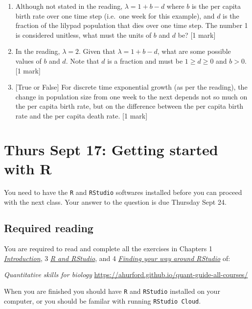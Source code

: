 \documentclass[]{book}
\begin{document}
\begin{enumerate}
\def\labelenumi{\arabic{enumi}.}
\setcounter{enumi}{6}
\item
  Although not stated in the reading, \(\lambda = 1 + b - d\) where
  \(b\) is the per capita birth rate over one time step (i.e.~one week
  for this example), and \(d\) is the fraction of the lilypad population
  that dies over one time step. The number 1 is considered unitless,
  what must the units of \(b\) and \(d\) be? {[}1 mark{]}
\item
  In the reading, \(\lambda = 2\). Given that \(\lambda = 1 + b - d\),
  what are some possible values of \(b\) and \(d\). {Note that \(d\) is
  a fraction and must be \(1 \geq d \geq 0\) and \(b>0\).} {[}1 mark{]}
\item
  {[}True or False{]} For discrete time exponential growth (as per the
  reading), the change in population size from one week to the next
  depends not so much on the per capita birth rate, but on the
  difference between the per capita birth rate and the per capita death
  rate. {[}1 mark{]}
\end{enumerate}

\chapter{Thurs Sept 17: Getting started with R}\label{Rinstall}

You need to have the \texttt{R} and \texttt{RStudio} softwares installed
before you can proceed with the next class. Your answer to the question
is due Thursday Sept 24.

\section{Required reading}\label{required-reading}

You are required to read and complete all the exercises in Chapters 1
\href{https://ahurford.github.io/quant-guide-all-courses/}{\emph{Introduction}},
3
\href{https://ahurford.github.io/quant-guide-all-courses/install.html}{\emph{R
and RStudio}}, and 4
\href{https://ahurford.github.io/quant-guide-all-courses/rstudio.html}{\emph{Finding
your way around RStudio}} of:

\emph{Quantitative skills for biology}
\url{https://ahurford.github.io/quant-guide-all-courses/}

When you are finished you should have \texttt{R} and \texttt{RStudio}
installed on your computer, or you should be familar with running
\texttt{RStudio\ Cloud}.
\end{document}
